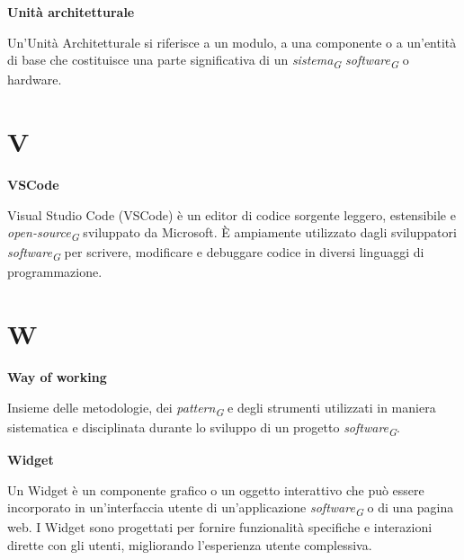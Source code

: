 \documentclass{article}
\begin{document}
\vspace{0.4cm}

\textbf{Unità architetturale}

\vspace{0.1cm}

Un'Unità Architetturale si riferisce a un modulo, a una componente o a un'entità di base che costituisce una parte significativa di un \textit{sistema}\textsubscript{\textit{G}} \textit{software}\textsubscript{\textit{G}} o hardware. 

\pagebreak
\section*{V}
{}

\vspace{0.4cm}

\textbf{VSCode}

\vspace{0.1cm}

Visual Studio Code (VSCode) è un editor di codice sorgente leggero, estensibile e \textit{open-source}\textsubscript{\textit{G}} sviluppato da Microsoft. È ampiamente utilizzato dagli sviluppatori \textit{software}\textsubscript{\textit{G}} per scrivere, modificare e debuggare codice in diversi linguaggi di programmazione.

\pagebreak
\section*{W}
{}

\vspace{0.4cm}

\textbf{Way of working}

\vspace{0.1cm}

Insieme delle metodologie, dei \textit{pattern}\textsubscript{\textit{G}} e degli strumenti utilizzati in maniera sistematica e disciplinata durante lo sviluppo di un progetto \textit{software}\textsubscript{\textit{G}}.

\vspace{0.4cm}

\textbf{Widget}

\vspace{0.1cm}

Un Widget è un componente grafico o un oggetto interattivo che può essere incorporato in un'interfaccia utente di un'applicazione \textit{software}\textsubscript{\textit{G}} o di una pagina web. I Widget sono progettati per fornire funzionalità specifiche e interazioni dirette con gli utenti, migliorando l'esperienza utente complessiva.
\end{document}
